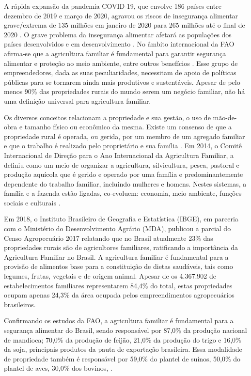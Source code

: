 A rápida expansão da pandemia COVID-19, que envolve 186 países entre dezembro de 2019 e março de 2020, agravou os riscos de insegurança alimentar grave/extrema de 135 milhões em janeiro de 2020 para 265 milhões até o final de 2020 \cite{dongyu_senior_2020}. O grave problema da insegurança alimentar afetará as populações dos países desenvolvidos e em desenvolvimento \cite{lal_home_2020}. No âmbito internacional da FAO afirma-se que a agricultura familiar é fundamental para garantir segurança alimentar e proteção ao meio ambiente, entre outros benefícios \cite{fao_panorama_2017}. Esse grupo de empreendedores, dada as suas peculiaridades, necessitam de apoio de políticas públicas para se tornarem ainda mais produtivos e sustentáveis. Apesar de pelo menos 90\% das propriedades rurais do mundo serem um negócio familiar, não há uma definição universal para agricultura familiar.

Os diversos conceitos relacionam a propriedade e sua gestão, o uso de mão-de-obra e tamanho físico ou econômico da mesma. Existe um consenso de que a propriedade rural é operada, ou gerida, por um membro de um agregado familiar e que o trabalho é realizado pelo proprietário e sua família \cite{schneider_teoria_2003}. Em 2014, o Comitê Internacional de Direção para o Ano Internacional da Agricultura Familiar, a definiu como um meio de organizar a agricultura, silvicultura, pesca, pastoral e produção aquícola que é gerido e operado por uma família e predominantemente dependente do trabalho familiar, incluindo mulheres e homens. Nestes sistemas, a família e a fazenda estão ligadas, co-evoluem: economia, meio ambiente, funções sociais e culturais \cite{fao_innovation_2014}.

Em 2018, o Instituto Brasileiro de Geografia e Estatística (IBGE), em parceria com o Ministério do Desenvolvimento Agrário (MDA), publicou a parcial do Censo Agropecuário 2017 \cite{ibge_censo_2018} relatando que no Brasil atualmente 23\% das propriedades rurais são de agricultores familiares, ratificando a importância da Agricultura Familiar no Brasil. A agricultura familiar é fundamental para a provisão de alimentos base para a constituição de dietas saudáveis, tais como legumes, frutas, vegetais e de origem animal. Apesar de os 4.367.902 de estabelecimentos familiares representarem 84,4\% do total, estas propriedades ocupam apenas 24,3\% da área ocupada pelos empreendimentos agropecuários brasileiros. 

Confirmando os estudos da FAO, a agricultura familiar é fundamental para a  segurança alimentar do Brasil, sendo responsável por 87,0\% da produção nacional de mandioca; 70,0\% da produção de feijão, 21,0\% da produção do trigo e 16,0\% da soja, principais produtos da pauta de exportação brasileira. Essa modalidade de propriedade também é responsável por 59,0\% do plantel de suínos, 50,0\% do plantel de aves, 30,0\% dos bovinos, \cite{ibge_censo_2018}.


